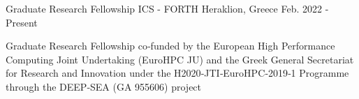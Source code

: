 

\begin{cventries}


  \cventry
    {Graduate Research Fellowship} %
    {ICS - FORTH} %
    {Heraklion, Greece} %
    {Feb. 2022 - Present} %
    {
      \begin{cvitems} %
          \item{Graduate Research Fellowship co‐funded  by  the  European  High  Performance  Computing  Joint  Undertaking 
	(EuroHPC  JU)  and  the  Greek  General  Secretariat  for  Research  and  Innovation under the H2020‐JTI‐EuroHPC‐2019‐1 Programme through the
          DEEP‐SEA (GA 955606) project}
      \end{cvitems}
    }


\end{cventries}
